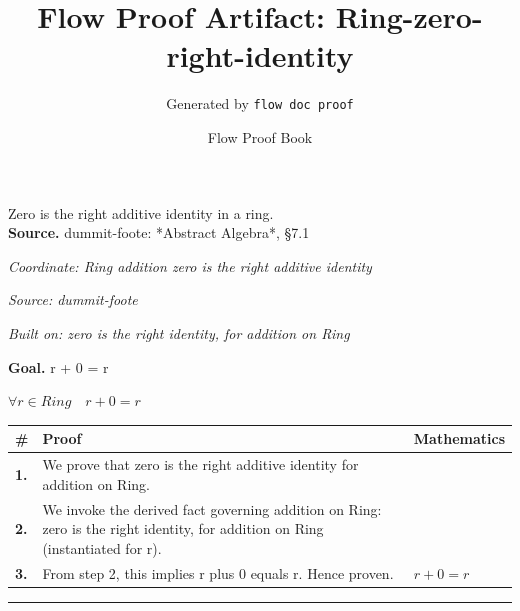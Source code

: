 \documentclass[11pt]{article}
\title{Flow Proof Artifact: Ring-zero-right-identity}
\author{Generated by \texttt{flow doc proof}}
\date{Flow Proof Book}
\theoremstyle{definition}
\begin{document}
\maketitle
Zero is the right additive identity in a ring.\\[0.5em]
\textbf{Source.} dummit-foote: *Abstract Algebra*, §7.1\\[0.5em]
\bigskip
{}\par
\smallskip\noindent\textit{Coordinate: Ring \cdot addition \cdot zero is the right additive identity}\par
\smallskip\noindent\textit{Source: dummit-foote}\par
\smallskip\noindent\textit{Built on: zero is the right identity, for addition on Ring}\par
\medskip
\noindent\textbf{Goal.} r + 0 = r\par
\noindent$\displaystyle \forall r \in Ring\quad r + 0 = r$\par
\medskip
\noindent
\begin{tabular}{@{} >{\raggedright\arraybackslash}p{} >{\raggedright\arraybackslash}p{} >{\raggedleft\arraybackslash}p{} @{}}
\textbf{\#} & \textbf{Proof} & \textbf{Mathematics} \\
\midrule
\textbf{1.} & We prove that zero is the right additive identity for addition on Ring. & \\[0.45em]
\textbf{2.} & We invoke the derived fact governing addition on Ring: zero is the right identity, for addition on Ring (instantiated for r). & \\[0.45em]
\textbf{3.} & From step 2, this implies r plus 0 equals r. Hence proven. & $\displaystyle r + 0 = r$ \\[0.45em]
\bottomrule
\end{tabular}
\label{thm:Ring-addition-zero_is_the_right_additive_identity}
\par\medskip\hrule
\end{document}
